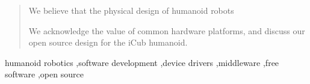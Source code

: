 \begin{frontmatter}
\begin{abstract}
We believe that the physical design of humanoid robots


We acknowledge the value of common hardware platforms,
and discuss our open source design for the iCub humanoid.

%
%



\end{abstract}

\begin{keyword}

humanoid robotics \sep software development \sep device drivers \sep middleware \sep free software \sep open source


\end{keyword}

\end{frontmatter}



